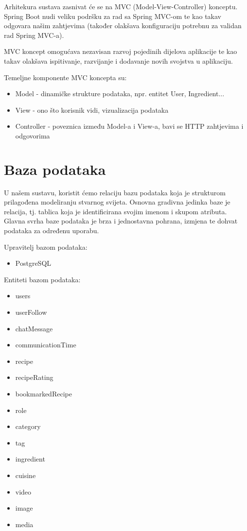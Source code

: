		Arhitekura sustava zasnivat će se na MVC (Model-View-Controller) konceptu.
		Spring Boot nudi veliku podršku za rad sa Spring MVC-om te kao takav
		odgovara našim zahtjevima (također olakšava konfiguraciju potrebnu za validan rad
		Spring MVC-a).

		MVC koncept omogućava nezavisan razvoj pojedinih dijelova aplikacije te kao takav
		olakšava ispitivanje, razvijanje i dodavanje novih svojstva u aplikaciju.

		\medbreak

		Temeljne komponente MVC koncepta su:
		\begin{itemize}
			\item Model - dinamičke strukture podataka, npr. entitet User, Ingredient...
			\item View - ono što korisnik vidi, vizualizacija podataka
			\item Controller - poveznica između Model-a i View-a, bavi se HTTP zahtjevima i odgovorima		
		\end{itemize}

		\eject
				
		\section{Baza podataka}

			U našem sustavu, koristit ćemo relaciju bazu podataka koja je strukturom prilagođena
			modeliranju stvarnog svijeta. Osnovna gradivna jedinka baze je relacija, tj. tablica
			koja je identificirana svojim imenom i skupom atributa. Glavna svrha baze podataka je
			brza i jednostavna pohrana, izmjena te dohvat podataka za određenu uporabu.

			\medbreak

			Upravitelj bazom podataka:
			\begin{itemize}
				\item PostgreSQL		
			\end{itemize}

			\medbreak

			Entiteti bazom podataka:
			\begin{itemize}
				\item users
				\item userFollow		
				\item chatMessage		
				\item communicationTime
				\item recipe		
				\item recipeRating		
				\item bookmarkedRecipe		
				\item role		
				\item category		
				\item tag		
				\item ingredient		
				\item cuisine		
				\item video		
				\item image		
				\item media				
			\end{itemize}
			
